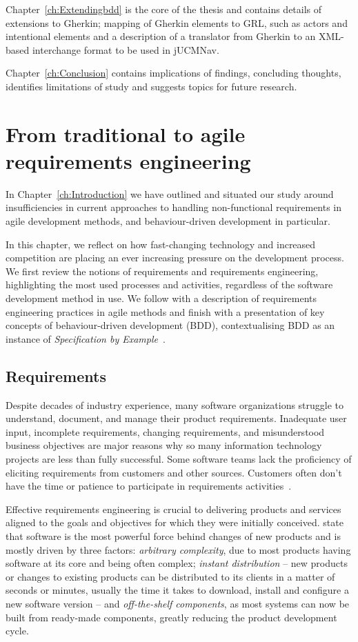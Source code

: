\documentclass[dissertation,final]{softeng}
\begin{document}
Chapter~\ref{ch:Extendingbdd} is the core of the thesis and contains details of extensions to Gherkin; mapping of Gherkin elements to GRL, such as actors and intentional elements and a description of a translator from Gherkin to an XML-based interchange format to be used in jUCMNav.

Chapter~\ref{ch:Conclusion} contains implications of findings, concluding thoughts, identifies limitations of study and suggests topics for future research.

\chapter{From traditional to agile requirements engineering}
\label{ch:Background}
In Chapter~\ref{ch:Introduction} we have outlined and situated our study around insufficiencies in current approaches to handling non-functional requirements in agile development methods, and behaviour-driven development in particular. 

In this chapter, we reflect on how fast-changing technology and increased competition are placing an ever increasing pressure on the development process. We first review the notions of requirements and requirements engineering, highlighting the most used processes and activities, regardless of the software development method in use. We follow with a description of requirements engineering practices in agile methods and finish with a presentation of key concepts of behaviour-driven development (BDD), contextualising BDD as an instance of \emph{Specification by Example}~\citep{Adzic201106}.

\section{Requirements}
\label{sec:requirements}
Despite decades of industry experience, many software organizations struggle to understand, document, and manage their product requirements. Inadequate user input, incomplete requirements, changing requirements, and misunderstood business objectives are major reasons why so many information technology projects are less than fully successful. Some software teams lack the proficiency of eliciting requirements from customers and other sources. Customers often don't have the time or patience to participate in requirements activities~\citep{Wiegers2013}. 

Effective requirements engineering is crucial to delivering products and services aligned to the goals and objectives for which they were initially conceived. \citet{Hull2011} state that software is the most powerful force behind changes of new products and is mostly driven by three factors: \emph{arbitrary complexity}, due to most products having software at its core and being often complex; \emph{instant distribution} -- new products or changes to existing products can be distributed to its clients in a matter of seconds or minutes, usually the time it takes to download, install and configure a new software version -- and \emph{off-the-shelf components}, as most systems can now be built from ready-made components, greatly reducing the product development cycle.
\end{document}
